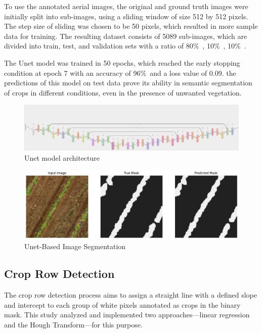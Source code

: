 \documentclass[conference]{IEEEtran}
\begin{document}
To use the annotated aerial images, the original and ground truth images were initially split into sub-images, using a sliding window of size 512 by 512 pixels. The step size of sliding was chosen to be 50 pixels, which resulted in more sample data for training. The resulting dataset consists of 5089 sub-images, which are divided into train, test, and validation sets with a ratio of 80\%\
, 10\%\
, 10\%\
.

The Unet model was trained in 50 epochs, which reached the early stopping condition at epoch 7 with an accuracy of 96\%\ and a loss value of 0.09. the predictions of this model on test data prove its ability in semantic segmentation of crops in different conditions, even in the presence of unwanted vegetation. 


\begin{figure}[htbp]
\includegraphics[width=\linewidth]{UNET.png}
\caption{Unet model architecture}
\label{fig3}
\end{figure}

    \begin{figure}[b]
        \centering
        \includegraphics[width=\linewidth]{Dryoutputgrass.png}
        \caption{Unet-Based Image Segmentation}
        \label{fig2:filtering}
    \end{figure}

\subsection{Crop Row Detection}\label{Crop Row Detection}
The crop row detection process aims to assign a straight line with a defined slope and intercept to each group of white pixels annotated as crops in the binary mask. This study analyzed and implemented two approaches—linear regression and the Hough Transform—for this purpose.
\end{document}
